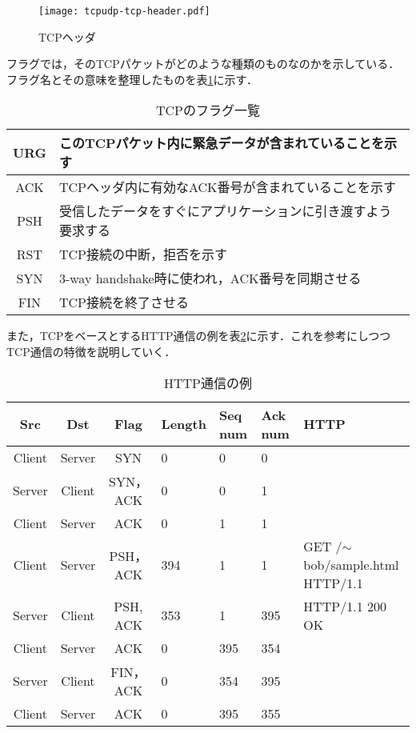 \begin{figure}[htb]
  \centering
  \texttt{[image: tcpudp-tcp-header.pdf]}
  \caption{TCPヘッダ}
  \label{tcpudp-tcp-header}
\end{figure}

フラグでは，そのTCPパケットがどのような種類のものなのかを示している．フラグ名とその意味を整理したものを表\ref{tcpudp-tcp-flaglist}に示す．

\begin{table}[htb]
  \centering
  \caption{TCPのフラグ一覧}
  \label{tcpudp-tcp-flaglist}
  \begin{tabular}{|c|l|} \hline
    URG & このTCPパケット内に緊急データが含まれていることを示す \\ \hline
    ACK & TCPヘッダ内に有効なACK番号が含まれていることを示す \\ \hline
    PSH & 受信したデータをすぐにアプリケーションに引き渡すよう要求する \\ \hline
    RST & TCP接続の中断，拒否を示す \\ \hline
    SYN & 3-way handshake時に使われ，ACK番号を同期させる \\ \hline
    FIN & TCP接続を終了させる \\ \hline
  \end{tabular}
\end{table}

また，TCPをベースとするHTTP通信の例を表\ref{tcpudp-http-sample}に示す．これを参考にしつつTCP通信の特徴を説明していく．

\begin{table}[htb]
  \centering
  \caption{HTTP通信の例}
  \label{tcpudp-http-sample}
  \begin{tabular}{|c|c|c|l|l|l|l|} \hline
      Src & Dst & Flag & Length & Seq num & Ack num & HTTP \\ \hline \hline
      Client & Server & SYN & 0 & 0 & 0 & \\ \hline
      Server & Client & SYN，ACK & 0 & 0 & 1 & \\ \hline
      Client & Server & ACK & 0 & 1 & 1 & \\ \hline
      Client & Server & PSH，ACK & 394 & 1 & 1 & \shortstack{GET /$\sim$bob/sample.html \\ HTTP/1.1} \\ \hline
      Server & Client & PSH, ACK & 353 & 1 & 395 & HTTP/1.1 200 OK \\ \hline
      Client & Server & ACK & 0 & 395 & 354 & \\ \hline
      Server & Client & FIN，ACK & 0 & 354 & 395 & \\ \hline
      Client & Server & ACK & 0 & 395 & 355 & \\ \hline
  \end{tabular}
\end{table}

